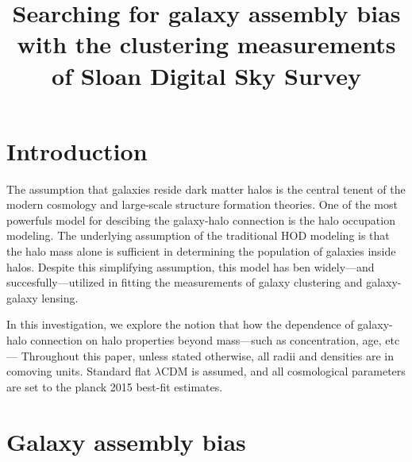 \documentclass[12pt, preprint]{aastex}
\newcommand{\beq}{\begin{equation}}
\newcommand{\eeq}{\end{equation}}
\begin{document}
\title{Searching for galaxy assembly bias with the clustering measurements of Sloan Digital Sky Survey}

\begin{abstract}

\end{abstract}

\section{Introduction}


The assumption that galaxies reside dark matter halos is the central tenent of the modern cosmology and 
large-scale structure formation theories. One of the most powerfuls model for descibing the galaxy-halo 
connection is the halo occupation modeling. The underlying assumption of the traditional HOD modeling is 
that the halo mass alone is sufficient in determining the population of galaxies inside halos. 
Despite this simplifying assumption, this model has ben widely---and succesfully---utilized in fitting 
the measurements of galaxy clustering and galaxy-galaxy lensing.

In this investigation, we explore the notion that how the dependence of galaxy-halo connection on 
halo properties beyond mass---such as concentration, age, etc---
Throughout this paper, unless stated otherwise, all radii and densities are in comoving units.
Standard flat $\lambda$CDM is assumed, and all cosmological parameters are set to the planck 
2015 best-fit estimates.

\section{Galaxy assembly bias}




\end{document}

